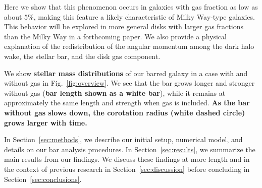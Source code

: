 \documentclass[twocolumn,linenumbers,trackchanges]{aastex631}
\newcommand{\RCR}{\ensuremath{R_{\textrm{CR}}}}
\newcommand{\Rot}{\ensuremath{\mathcal{R}}}
\begin{document}
Here we show that this phenomenon occurs in galaxies with gas fraction
as low as about $5\%$, making this feature a likely characteristic of  Milky
Way-type galaxies. This behavior will be explored in more general disks with
larger gas fractions than the Milky Way in a forthcoming paper.
We also provide a physical explanation of the redistribution of the angular
momentum among the dark halo wake, the stellar bar, and the disk gas component. 


We show {\bf stellar mass distributions} of our barred galaxy in a case with and
without gas in Fig.~\ref{fig:overview}. We see that the bar grows longer and
stronger without gas ({\bf bar length shown as a white bar}), while it remains
at approximately the same length and strength when gas is included. {\bf As the
bar without gas slows down, the corotation radius (white dashed circle) grows
larger with time.}


In Section~\ref{sec:methods}, we describe our initial setup, numerical model,
and details on our bar analysis procedures. In Section~\ref{sec:results}, we
summarize the main results from our findings. We discuss these findings at more
length and in the context of previous research in Section~\ref{sec:discussion}
before concluding in Section~\ref{sec:conclusions}.

\end{document}

